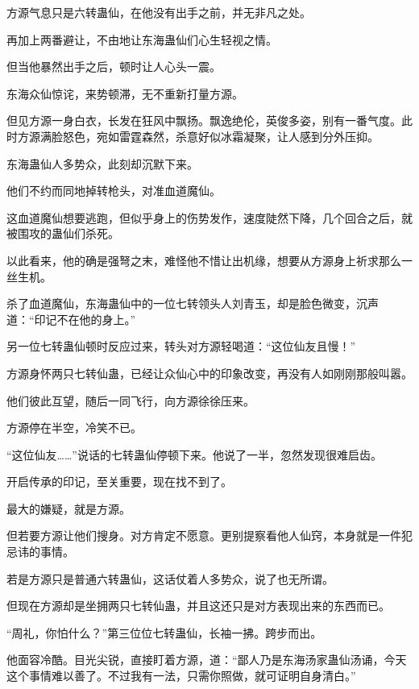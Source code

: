 
\begin{this_body}



方源气息只是六转蛊仙，在他没有出手之前，并无非凡之处。

再加上两番避让，不由地让东海蛊仙们心生轻视之情。

但当他暴然出手之后，顿时让人心头一震。

东海众仙惊诧，来势顿滞，无不重新打量方源。

但见方源一身白衣，长发在狂风中飘扬。飘逸绝伦，英俊多姿，别有一番气度。此时方源满脸怒色，宛如雷霆森然，杀意好似冰霜凝聚，让人感到分外压抑。

东海蛊仙人多势众，此刻却沉默下来。

他们不约而同地掉转枪头，对准血道魔仙。

这血道魔仙想要逃跑，但似乎身上的伤势发作，速度陡然下降，几个回合之后，就被围攻的蛊仙们杀死。

以此看来，他的确是强弩之末，难怪他不惜让出机缘，想要从方源身上祈求那么一丝生机。

杀了血道魔仙，东海蛊仙中的一位七转领头人刘青玉，却是脸色微变，沉声道：“印记不在他的身上。”

另一位七转蛊仙顿时反应过来，转头对方源轻喝道：“这位仙友且慢！”

方源身怀两只七转仙蛊，已经让众仙心中的印象改变，再没有人如刚刚那般叫嚣。

他们彼此互望，随后一同飞行，向方源徐徐压来。

方源停在半空，冷笑不已。

“这位仙友……”说话的七转蛊仙停顿下来。他说了一半，忽然发现很难启齿。

开启传承的印记，至关重要，现在找不到了。

最大的嫌疑，就是方源。

但若要方源让他们搜身。对方肯定不愿意。更别提察看他人仙窍，本身就是一件犯忌讳的事情。

若是方源只是普通六转蛊仙，这话仗着人多势众，说了也无所谓。

但现在方源却是坐拥两只七转仙蛊，并且这还只是对方表现出来的东西而已。

“周礼，你怕什么？”第三位位七转蛊仙，长袖一拂。跨步而出。

他面容冷酷。目光尖锐，直接盯着方源，道：“鄙人乃是东海汤家蛊仙汤诵，今天这个事情难以善了。不过我有一法，只需你照做，就可证明自身清白。”


\end{this_body}
